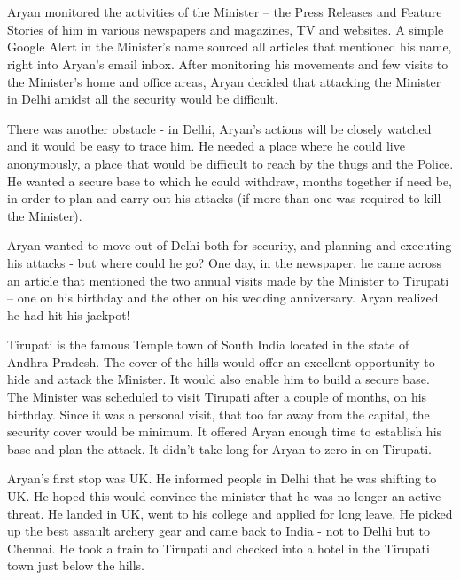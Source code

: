\chapter{}

Aryan monitored the activities of the Minister – the Press Releases and Feature
Stories of him in various newspapers and magazines, TV and websites. A simple
Google Alert in the Minister's name sourced all articles that mentioned his
name, right into Aryan's email inbox. After monitoring his movements and few
visits to the Minister's home and office areas, Aryan decided that attacking the
Minister in Delhi amidst all the security would be difficult.

There was another obstacle - in Delhi, Aryan's actions will be closely watched
and it would be easy to trace him. He needed a place where he could live
anonymously, a place that would be difficult to reach by the thugs and the
Police. He wanted a secure base to which he could withdraw, months together if
need be, in order to plan and carry out his attacks (if more than one was
required to kill the Minister).

Aryan wanted to move out of Delhi both for security, and planning and executing
his attacks - but where could he go? One day, in the newspaper, he came across
an article that mentioned the two annual visits made by the Minister to Tirupati
– one on his birthday and the other on his wedding anniversary. Aryan realized
he had hit his jackpot!

Tirupati is the famous Temple town of South India located in the state of Andhra
Pradesh. The cover of the hills would offer an excellent opportunity to hide and
attack the Minister. It would also enable him to build a secure base. The
Minister was scheduled to visit Tirupati after a couple of months, on his
birthday. Since it was a personal visit, that too far away from the capital, the
security cover would be minimum. It offered Aryan enough time to establish his
base and plan the attack. It didn't take long for Aryan to zero-in on Tirupati.

Aryan's first stop was UK. He informed people in Delhi that he was shifting to
UK. He hoped this would convince the minister that he was no longer an active
threat. He landed in UK, went to his college and applied for long leave. He
picked up the best assault archery gear and came back to India - not to Delhi
but to Chennai. He took a train to Tirupati and checked into a hotel in the
Tirupati town just below the hills.